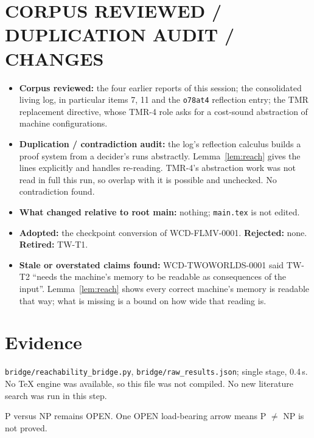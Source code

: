 \documentclass[11pt]{article}
\begin{document}
\section{CORPUS REVIEWED / DUPLICATION AUDIT / CHANGES}
\begin{itemize}
\item \textbf{Corpus reviewed:} the four earlier reports of this session; the consolidated living log, in particular items 7, 11 and the \texttt{o78at4} reflection entry; the TMR replacement directive, whose TMR-4 role asks for a cost-sound abstraction of machine configurations.
\item \textbf{Duplication / contradiction audit:} the log's reflection calculus builds a proof system from a decider's runs abstractly. Lemma~\ref{lem:reach} gives the lines explicitly and handles re-reading. TMR-4's abstraction work was not read in full this run, so overlap with it is possible and unchecked. No contradiction found.
\item \textbf{What changed relative to root main:} nothing; \texttt{main.tex} is not edited.
\item \textbf{Adopted:} the checkpoint conversion of WCD-FLMV-0001. \textbf{Rejected:} none. \textbf{Retired:} TW-T1.
\item \textbf{Stale or overstated claims found:} WCD-TWOWORLDS-0001 said TW-T2 ``needs the machine's memory to be readable as consequences of the input''. Lemma~\ref{lem:reach} shows every correct machine's memory is readable that way; what is missing is a bound on how wide that reading is.
\end{itemize}

\section{Evidence}
\texttt{bridge/reachability\_bridge.py}, \texttt{bridge/raw\_results.json}; single stage, 0.4\,s. No TeX engine was available, so this file was not compiled. No new literature search was run in this step.

\medskip\noindent P versus NP remains OPEN. One OPEN load-bearing arrow means P $\ne$ NP is not proved.
\end{document}
